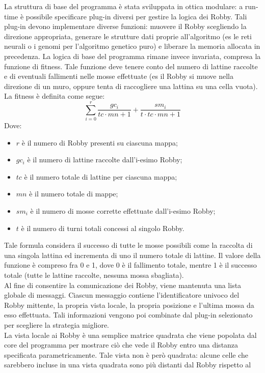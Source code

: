 La struttura di base del programma è stata sviluppata in ottica modulare: a 
run-time è possibile specificare plug-in diversi per gestire la logica dei 
Robby. Tali plug-in devono implementare diverse funzioni: muovere il Robby 
scegliendo la direzione appropriata, generare le strutture dati proprie 
all'algoritmo (es le reti neurali o i genomi per l'algoritmo genetico puro) e 
liberare la memoria allocata in precedenza. La logica di base del programma 
rimane invece invariata, compresa la funzione di fitness. Tale funzione 
deve tenere conto del numero di lattine raccolte e di eventuali fallimenti 
nelle mosse effettuate (es il Robby si muove nella direzione di un muro, oppure 
tenta di raccogliere una lattina su una cella vuota). La fitness è definita 
come segue:
\[\sum\limits_{i=0}^{r} \frac{gc_i}{tc\cdot mn+1}+\frac{sm_i}{t\cdot tc 
\cdot mn + 1}\]
Dove:
\begin{itemize}
 \item $r$ è il numero di Robby presenti su ciascuna mappa;
 \item $gc_i$ è il numero di lattine raccolte dall'i-esimo Robby;
 \item $tc$ è il numero totale di lattine per ciascuna mappa;
 \item $mn$ è il numero totale di mappe;
 \item $sm_i$ è il numero di mosse corrette effettuate dall'i-esimo Robby;
 \item $t$ è il numero di turni totali concessi al singolo Robby.
\end{itemize}
Tale formula considera il successo di tutte le mosse possibili come la raccolta 
di una singola lattina ed incrementa di uno il numero totale di lattine. Il 
valore della funzione è compreso fra 0 e 1, dove 0 è il fallimento totale, 
mentre 1 è il successo totale (tutte le lattine raccolte, nessuna mossa 
sbagliata).
\\
Al fine di consentire la comunicazione dei Robby, viene mantenuta una lista 
globale di messaggi. Ciascun messaggio contiene l'identificatore univoco del 
Robby mittente, la propria vista locale, la propria posizione e l'ultima mossa 
da esso effettuata. Tali informazioni vengono poi combinate dal plug-in 
selezionato per scegliere la strategia migliore.
\\
La vista locale ai Robby è una semplice matrice quadrata che viene popolata dal 
core del programma per mostrare ciò che vede il Robby entro una distanza 
specificata parametricamente. Tale vista non è però quadrata: alcune celle che 
sarebbero incluse in una vista quadrata sono più distanti dal Robby rispetto al 
